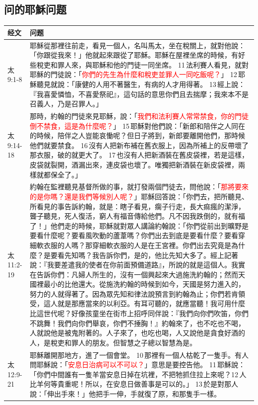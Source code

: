 \subsection{问的耶穌问题}
\begin{table}[H]
  \centering  
    \begin{tabular}{p{4.72em}|p{40.72em}} \toprule
 经文& \textbf{问题}  \\ \midrule
太9:1-8&耶穌從那裡往前走，看見一個人，名叫馬太，坐在稅關上，就對他說：「你跟從我來！」他就起來跟從了耶穌。耶穌在屋裡坐席的時候，有好些稅吏和罪人來，與耶穌和他的門徒一同坐席。 11 法利賽人看見，就對耶穌的門徒說：「\textcolor{red}{你們的先生為什麼和稅吏並罪人一同吃飯呢？}」 12 耶穌聽見就說：「康健的人用不著醫生，有病的人才用得著。 13 經上說：『我喜愛憐恤，不喜愛祭祀』，這句話的意思你們且去揣摩；我來本不是召義人，乃是召罪人。」 \\ \midrule  
太9:14-18& 那時，約翰的門徒來見耶穌，說：「\textcolor{red}{我們和法利賽人常常禁食，你的門徒倒不禁食，這是為什麼呢？}」 15 耶穌對他們說：「新郎和陪伴之人同在的時候，陪伴之人豈能哀慟呢？但日子將到，新郎要離開他們，那時候他們就要禁食。 16 沒有人把新布補在舊衣服上，因為所補上的反帶壞了那衣服，破的就更大了。 17 也沒有人把新酒裝在舊皮袋裡，若是這樣，皮袋就裂開，酒漏出來，連皮袋也壞了。唯獨把新酒裝在新皮袋裡，兩樣就都保全了。」   \\\midrule
太11:2-19&約翰在監裡聽見基督所做的事，就打發兩個門徒去，問他說：「\textcolor{red}{那將要來的是你嗎？還是我們等候別人呢？}」耶穌回答說：「你們去，把所聽見、所看見的事告訴約翰，就是：瞎子看見，瘸子行走，長大痲瘋的潔淨，聾子聽見，死人復活，窮人有福音傳給他們。凡不因我跌倒的，就有福了！」他們走的時候，耶穌就對眾人講論約翰說：「你們從前出到曠野是要看什麼呢？要看風吹動的蘆葦嗎？你們出去到底是要看什麼？要看穿細軟衣服的人嗎？那穿細軟衣服的人是在王宮裡。你們出去究竟是為什麼？是要看先知嗎？我告訴你們，是的，他比先知大多了。經上記著說：『我要差遣我的使者在你前面預備道路』，所說的就是這個人。我實在告訴你們：凡婦人所生的，沒有一個興起來大過施洗約翰的；然而天國裡最小的比他還大。從施洗約翰的時候到如今，天國是努力進入的，努力的人就得著了。因為眾先知和律法說預言到約翰為止；你們若肯領受，這人就是那應當來的以利亞。有耳可聽的，就應當聽！我可用什麼比這世代呢？好像孩童坐在街市上招呼同伴說：『我們向你們吹笛，你們不跳舞！我們向你們舉哀，你們不捶胸！』約翰來了，也不吃也不喝，人就說他是被鬼附著的。人子來了，也吃也喝，人又說他是貪食好酒的人，是稅吏和罪人的朋友。但智慧之子總以智慧為是。\\\midrule
太12:9-21&耶穌離開那地方，進了一個會堂。 10 那裡有一個人枯乾了一隻手。有人問耶穌說：「\textcolor{red}{安息日治病可以不可以？}」意思是要控告他。 11 耶穌說：「你們中間誰有一隻羊當安息日掉在坑裡，不把牠抓住拉上來呢？12 人比羊何等貴重呢！所以，在安息日做善事是可以的。」 13 於是對那人說：「伸出手來！」他把手一伸，手就復了原，和那隻手一樣。\\\midrule

\end{tabular}
\end{table}
